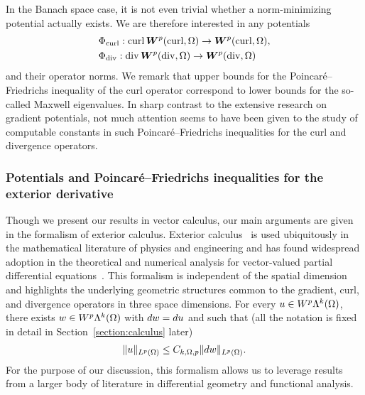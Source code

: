 \documentclass[10pt,a4paper]{article}
\begin{document}
In the Banach space case, it is not even trivial whether a norm-minimizing potential actually exists. 
We are therefore interested in any potentials 
\begin{align}
    &\Phi_{\operatorname{curl}} : \operatorname{curl} \bm{W}^{p}(\operatorname{curl},\Omega) \rightarrow \bm{W}^{p}(\operatorname{curl},\Omega)
    ,
    \\
    &\Phi_{\operatorname{div}} : \operatorname{div} \bm{W}^{p}(\operatorname{div},\Omega) \rightarrow \bm{W}^{p}(\operatorname{div},\Omega)
\end{align}
and their operator norms. We remark that upper bounds for the Poincar\'e--Friedrichs inequality of the curl operator correspond to lower bounds for the so-called Maxwell eigenvalues. 
In sharp contrast to the extensive research on gradient potentials, 
not much attention seems to have been given to the study of computable constants in such Poincar\'e--Friedrichs inequalities for the curl and divergence operators. 




\subsubsection{Potentials and Poincar\'e--Friedrichs inequalities for the exterior derivative}

Though we present our results in vector calculus, our main arguments are given in the formalism of exterior calculus. 
Exterior calculus~\cite{greub1967multilinear,lee2012smooth} is used ubiquitously in the mathematical literature of physics and engineering and has found widespread adoption in the theoretical and numerical analysis for vector-valued partial differential equations~\cite{hiptmair2002finite, gross2004electromagnetic, arnold2006finite, arnold2009geometric, arnold2010finite, demlow2014posteriori, licht2021local, arnold2021complexes}. 
This formalism is independent of the spatial dimension and highlights the underlying geometric structures common to the gradient, curl, and divergence operators in three space dimensions.
For every $u \in W^{p}\Lambda^{k}(\Omega)$, there exists $w \in W^{p}\Lambda^{k}(\Omega)$ with $d w = d u$ and such that (all the notation is fixed in detail in Section~\ref{section:calculus} later)
\begin{align} \label{math:intro:exterior:pf} 
    \| u \|_{L^{p}(\Omega)} \leq  C_{k,\Omega,p} \| d w \|_{L^{p}(\Omega)}.
\end{align} 
For the purpose of our discussion, this formalism allows us to leverage results from a larger body of literature in differential geometry and functional analysis. 
\end{document}
